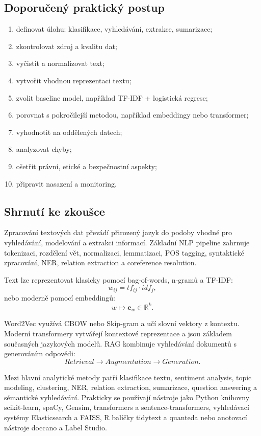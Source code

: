 \subsection{Doporučený praktický postup}

\begin{enumerate}
    \item definovat úlohu: klasifikace, vyhledávání, extrakce, sumarizace;
    \item zkontrolovat zdroj a kvalitu dat;
    \item vyčistit a normalizovat text;
    \item vytvořit vhodnou reprezentaci textu;
    \item zvolit baseline model, například TF-IDF + logistická regrese;
    \item porovnat s pokročilejší metodou, například embeddingy nebo transformer;
    \item vyhodnotit na oddělených datech;
    \item analyzovat chyby;
    \item ošetřit právní, etické a bezpečnostní aspekty;
    \item připravit nasazení a monitoring.
\end{enumerate}

\subsection{Shrnutí ke zkoušce}

Zpracování textových dat převádí přirozený jazyk do podoby vhodné pro vyhledávání, modelování a extrakci
informací. Základní NLP pipeline zahrnuje tokenizaci, rozdělení vět, normalizaci, lemmatizaci, POS tagging,
syntaktické zpracování, NER, relation extraction a coreference resolution.

Text lze reprezentovat klasicky pomocí bag-of-words, n-gramů a TF-IDF:
\[
w_{ij}=tf_{ij}\cdot idf_j,
\]
nebo moderně pomocí embeddingů:
\[
w \mapsto \mathbf{e}_w\in\mathbb{R}^k.
\]

Word2Vec využívá CBOW nebo Skip-gram a učí slovní vektory z kontextu. Moderní transformery vytvářejí
kontextové reprezentace a jsou základem současných jazykových modelů. RAG kombinuje vyhledávání dokumentů
s generováním odpovědi:
\[
Retrieval \rightarrow Augmentation \rightarrow Generation.
\]

Mezi hlavní analytické metody patří klasifikace textu, sentiment analysis, topic modeling, clustering,
NER, relation extraction, sumarizace, question answering a sémantické vyhledávání. Prakticky se používají
nástroje jako Python knihovny scikit-learn, spaCy, Gensim, transformers a sentence-transformers,
vyhledávací systémy Elasticsearch a FAISS, R balíčky tidytext a quanteda nebo anotovací nástroje doccano
a Label Studio.


